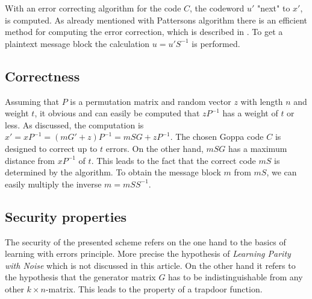 With an error correcting algorithm for the code $C$, the codeword $u'$ "next" to $x'$, is computed. As already mentioned with Pattersons algorithm there is an efficient method for computing the error correction, which is described in \cite{patterson1975algebraic}.
To get a plaintext message block the calculation $u = u'S^{-1}$ is performed\cite{mceliece1978public}.


\subsection*{Correctness}
Assuming that $P$ is a permutation matrix and random vector $z$ with length $n$ and weight $t$, it obvious and can easily be computed that $zP^{-1}$ has a weight of $t$ or less.
As discussed, the computation is $x' = x P^{-1} = (mG'+z)P^{-1} = mSG + z P^{-1}$.
The chosen Goppa code $C$ is designed to correct up to $t$ errors. On the other hand, $mSG$ has a maximum distance from $xP^{-1}$ of $t$. This leads to the fact that the correct code $mS$ is determined by the algorithm. 
To obtain the message block $m$ from $mS$, we can easily multiply the inverse $m = mSS^{-1}$\cite{wiki:mcelice}.

\subsection*{Security properties}
The security of the presented scheme refers on the one hand to the basics of learning with errors principle. More precise the hypothesis of \textit{Learning Parity with Noise}\cite{pietrzak2012cryptography} which is not discussed in this article. 
On the other hand it refers to the hypothesis that the generator matrix $G$ has to be indistinguishable from any other $k \times n$-matrix. This leads to the property of a trapdoor function.


